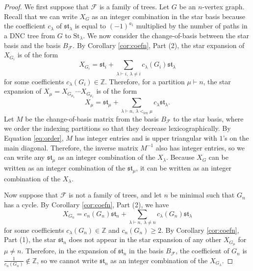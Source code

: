 \documentclass[12pt]{amsart}  %
\theoremstyle{definition}
\theoremstyle{remark}
\numberwithin{equation}{section}
\begin{document}
\begin{proof} We first suppose that $\mathcal F$ is a family of trees. Let $G$ be an $n$-vertex graph. Recall that we can write $X_G$ as an integer combination in the star basis because the coefficient $c_\lambda$ of $\mathfrak{st}_\lambda$ is equal to $(-1)^{a_1}$ multiplied by the number of paths in a DNC tree from $G$ to $\text{St}_\lambda$. We now consider the change-of-basis between the star basis and the basis $B_{\mathcal F}$. By Corollary \ref{cor:coefn}, Part (2), the star expansion of $X_{G_i}$ is of the form
\begin{equation}
X_{G_i}=\mathfrak{st}_i+\sum_{\lambda\vdash i, \ \lambda\neq i}c_\lambda(G_i)\mathfrak{st}_\lambda
\end{equation}
for some coefficients $c_\lambda(G_i)\in\mathbb Z$. Therefore, for a partition $\mu\vdash n$, the star expansion of $X_\mu=X_{G_{\mu_1}}\cdots X_{G_{\mu_\ell}}$ is of the form
\begin{equation} \label{eq:order}
X_\mu=\mathfrak{st}_\mu+\sum_{\lambda\vdash n, \ \lambda<_{\text{lex}}\mu}c_\lambda\mathfrak{st}_\lambda.
\end{equation}
Let $M$ be the change-of-basis matrix from the basis $B_{\mathcal F}$ to the star basis, where we order the indexing partitions so that they decrease lexicographically. By Equation \eqref{eq:order}, $M$ has integer entries and is upper triangular with $1$'s on the main diagonal. Therefore, the inverse matrix $M^{-1}$ also has integer entries, so we can write any $\mathfrak{st}_\mu$ as an integer combination of the $X_\lambda$. Because $X_G$ can be written as an integer combination of the $\mathfrak{st}_\mu$, it can be written as an integer combination of the $X_\lambda$.

Now suppose that $\mathcal F$ is not a family of trees, and let $n$ be minimal such that $G_n$ has a cycle. By Corollary \ref{cor:coefn}, Part (2), we have \begin{equation}X_{G_n}=c_n(G_n)\mathfrak{st}_n+\sum_{\lambda\vdash n, \ \lambda\neq n}c_\lambda(G_n)\mathfrak{st}_\lambda\end{equation}
for some coefficients $c_\lambda(G_n)\in\mathbb Z$ and $c_n(G_n)\geq 2$. By Corollary \ref{cor:coefn}, Part (1), the star $\mathfrak{st}_n$ does not appear in the star expansion of any other $X_{G_\mu}$ for $\mu\neq n$. Therefore, in the expansion of $\mathfrak{st}_n$ in the basis $B_{\mathcal F}$, the coefficient of $G_n$ is $\frac 1{c_n(G_n)}\notin\mathbb Z$, so we cannot write $\mathfrak{st}_n$ as an integer combination of the $X_{G_\lambda}$. 
\end{proof}
\end{document}
